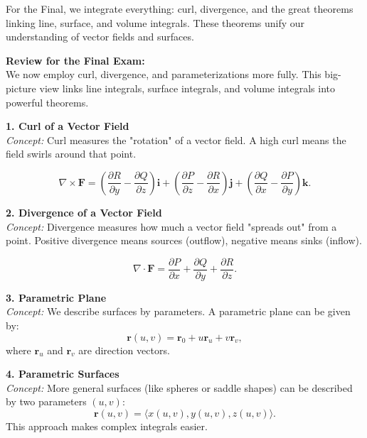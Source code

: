 \documentclass[9pt]{article}
\begin{document}
\noindent For the Final, we integrate everything: curl, divergence, and the great theorems linking line, surface, and volume integrals. These theorems unify our understanding of vector fields and surfaces.

\begin{multicols}{2}
\footnotesize

\noindent \textbf{Review for the Final Exam:}\\
We now employ curl, divergence, and parameterizations more fully. This big-picture view links line integrals, surface integrals, and volume integrals into powerful theorems.

\begin{tcolorbox}[title=, colframe=brightblue]
\textbf{1. Curl of a Vector Field}\\
\textit{Concept:} Curl measures the "rotation" of a vector field. A high curl means the field swirls around that point.

\[
\nabla \times \mathbf{F}=\left(\frac{\partial R}{\partial y}-\frac{\partial Q}{\partial z}\right)\mathbf{i}+\left(\frac{\partial P}{\partial z}-\frac{\partial R}{\partial x}\right)\mathbf{j}+\left(\frac{\partial Q}{\partial x}-\frac{\partial P}{\partial y}\right)\mathbf{k}.
\]
\end{tcolorbox}

\begin{tcolorbox}[title=, colframe=brightgreen]
\textbf{2. Divergence of a Vector Field}\\
\textit{Concept:} Divergence measures how much a vector field "spreads out" from a point. Positive divergence means sources (outflow), negative means sinks (inflow).

\[
\nabla \cdot \mathbf{F}=\frac{\partial P}{\partial x}+\frac{\partial Q}{\partial y}+\frac{\partial R}{\partial z}.
\]
\end{tcolorbox}

\begin{tcolorbox}[title=, colframe=brightpink]
\textbf{3. Parametric Plane}\\
\textit{Concept:} We describe surfaces by parameters. A parametric plane can be given by:
\[
\mathbf{r}(u,v) = \mathbf{r}_0 + u\mathbf{r}_u + v\mathbf{r}_v,
\]
where $\mathbf{r}_u$ and $\mathbf{r}_v$ are direction vectors.
\end{tcolorbox}

\begin{tcolorbox}[title=, colframe=brightyellow]
\textbf{4. Parametric Surfaces}\\
\textit{Concept:} More general surfaces (like spheres or saddle shapes) can be described by two parameters $(u,v)$:
\[
\mathbf{r}(u,v)=\langle x(u,v), y(u,v), z(u,v)\rangle.
\]
This approach makes complex integrals easier.
\end{tcolorbox}


\end{multicols}
\end{document}
